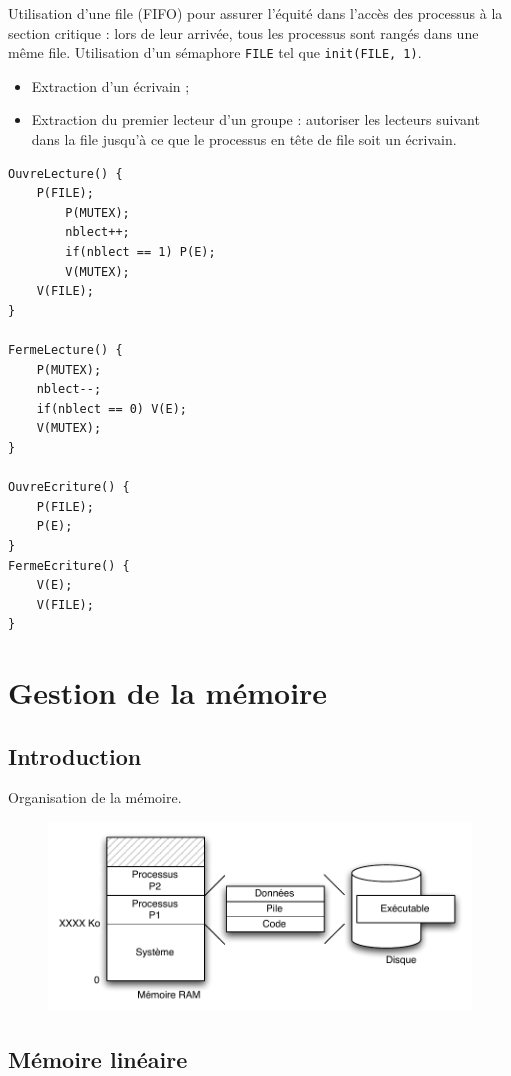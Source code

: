 \documentclass[11pt,english,french]{scrreprt}
\theoremstyle{remark}
\theoremstyle{definition}
\begin{document}
Utilisation d'une file (FIFO) pour assurer l'équité dans l'accès des processus à la section critique : lors de leur arrivée, tous les processus sont rangés dans une même file. Utilisation d'un sémaphore \lstinline!FILE! tel que \lstinline!init(FILE, 1)!. \begin{itemize}
	\item Extraction d'un écrivain ;
	\item Extraction du premier lecteur d'un groupe : autoriser les lecteurs suivant dans la file jusqu'à ce que le processus en tête de file soit un écrivain. 
\end{itemize}

\begin{lstlisting}[multicols=3,tabsize=4]
OuvreLecture() {
	P(FILE);
		P(MUTEX);
		nblect++;
		if(nblect == 1) P(E);
		V(MUTEX);
	V(FILE);
}

FermeLecture() {
	P(MUTEX);
	nblect--;
	if(nblect == 0) V(E);
	V(MUTEX);
}

OuvreEcriture() {
	P(FILE);
	P(E);
}
FermeEcriture() {
	V(E);
	V(FILE);
}	
\end{lstlisting}

\chapter{Gestion de la mémoire}
\section{Introduction}

Organisation de la mémoire.

\begin{figure}[h!]
	\center
	\vspace{-10pt}
	\includegraphics[scale=.85]{img/memoire-org}
\end{figure}

\section{Mémoire linéaire}
\end{document}
